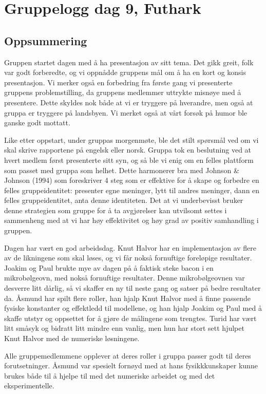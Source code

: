\documentclass[a4paper, norsk, 12pt]{report}
\begin{document}
\chapter*{Gruppelogg dag 9, Futhark}

\section*{Oppsummering}
Gruppen startet dagen med å ha presentasjon av sitt tema. Det gikk greit, folk
var godt forberedte, og vi oppnådde gruppens mål om å ha en kort og konsis
presentasjon. Vi merker også en forbedring fra første gang vi presenterte
gruppens problemstilling, da gruppens medlemmer uttrykte misnøye med å
presentere. Dette skyldes nok både at vi er tryggere på hverandre, men også at
gruppa er tryggere på landsbyen. Vi merket også at vårt forsøk på humor ble
ganske godt mottatt.

Like etter oppstart, under gruppas morgenmøte, ble det stilt spørsmål ved om vi
skal skrive rapportene på engelsk eller norsk. Gruppa tok en beslutning ved at
hvert medlem først presenterte sitt syn, og så ble vi enig om en felles
plattform som passet med gruppa som helhet. Dette harmonerer bra med Johnson \&
Johnson (1994) som foreskriver 4 steg som er effektive for å skape og forbedre
en felles gruppeidentitet: presenter egne meninger, lytt til andres meninger,
dann en felles gruppeidentitet, anta denne identiteten. Det at vi underbevisst
bruker denne strategien som gruppe for å ta avgjørelser kan utvilsomt settes i
sammenheng med at vi har høy effektivitet og høy grad av positiv samhandling i
gruppen.

Dagen har vært en god arbeidsdag. Knut Halvor har en implementasjon av flere av
de likningene som skal løses, og vi får nokså fornuftige foreløpige resultater.
Joakim og Paul brukte mye av dagen på å faktisk steke bacon i en mikrobølgeovn,
med nokså fornuftige resultater. Denne mikrobølgeovnen var desverre litt dårlig,
så vi skaffer en ny til neste gang og satser på bedre resultater da. Åsmund har
spilt flere roller, han hjalp Knut Halvor med å finne passende fysiske
konstanter og effektledd til modellene, og han hjalp Joakim og Paul med å skaffe
utstyr og oppsettet for å gjøre de målingene som trengtes. Turid har vært litt småsyk og
bidratt litt mindre enn vanlig, men hun har stort sett hjulpet Knut Halvor med
de numeriske løsningene.

Alle gruppemedlemmene opplever at deres roller i gruppa passer godt til deres
forutsetninger. Åsmund var spesielt fornøyd med at hans fysikkkunskaper kunne
brukes både til å hjelpe til med det numeriske arbeidet og med det
eksperimentelle. 
\end{document}
